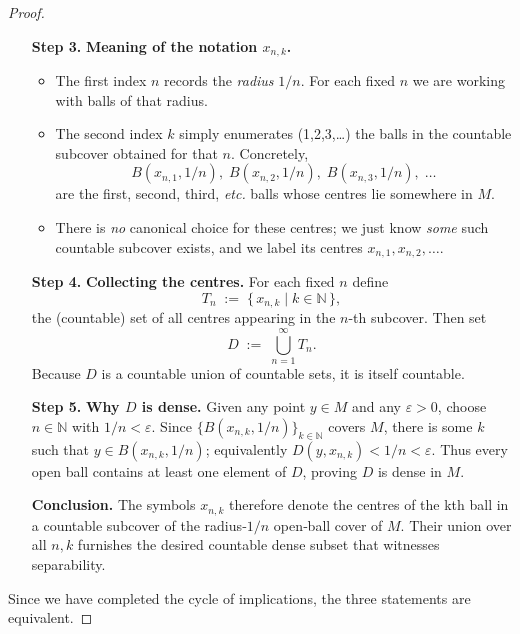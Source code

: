\documentclass[12pt]{article}
\theoremstyle{definition} %
\theoremstyle{plain} %
\begin{document}
\begin{proof}
\begin{enumerate}
  \item[\textbf{Step 3.}] 
      \textbf{Meaning of the notation \(x_{n,k}\).}  
      \begin{itemize}
          \item The first index \(n\) records the \emph{radius} \(1/n\).  
                For each fixed \(n\) we are working with balls of that
                radius.
          \item The second index \(k\) simply enumerates (1,2,3,\dots) the
                balls in the countable subcover obtained for that \(n\).
                Concretely,
                \[
                    B(x_{n,1},1/n),\;B(x_{n,2},1/n),\;B(x_{n,3},1/n),\;\ldots
                \]
                are the first, second, third, \emph{etc.} balls whose
                centres lie somewhere in \(M\).
          \item There is \emph{no} canonical choice for these centres; we
                just know \emph{some} such countable subcover exists, and we
                label its centres \(x_{n,1},x_{n,2},\dots\).
      \end{itemize}

  \item[\textbf{Step 4.}] 
      \textbf{Collecting the centres.}  
      For each fixed \(n\) define
      \[
          T_n \;:=\;\bigl\{\,x_{n,k}\mid k\in\mathbb N\,\bigr\},
      \]
      the (countable) set of all centres appearing in the \(n\)-th
      subcover.  Then set
      \[
          D \;:=\;\bigcup_{n=1}^\infty T_n.
      \]
      Because \(D\) is a countable union of countable sets, it is itself
      countable.

  \item[\textbf{Step 5.}] 
      \textbf{Why \(D\) is dense.}  
      Given any point \(y\in M\) and any \(\varepsilon>0\), choose
      \(n\in\mathbb N\) with \(1/n<\varepsilon\).  Since
      \(\{B(x_{n,k},1/n)\}_{k\in\mathbb N}\) covers \(M\),
      there is some \(k\) such that \(y\in B(x_{n,k},1/n)\); equivalently
      \(D(y,x_{n,k})<1/n<\varepsilon\).  Thus every open ball contains at
      least one element of \(D\), proving \(D\) is dense in \(M\).

  \item[\textbf{Conclusion.}]  
      The symbols \(x_{n,k}\) therefore denote the centres of the kth ball
      in a countable subcover of the radius‑\(1/n\) open‐ball cover of \(M\).
      Their union over all \(n,k\) furnishes the desired countable dense
      subset that witnesses separability.
\end{enumerate}

  \medskip\noindent
  Since we have completed the cycle of implications,
  the three statements are equivalent.
\end{proof}
\end{document}
